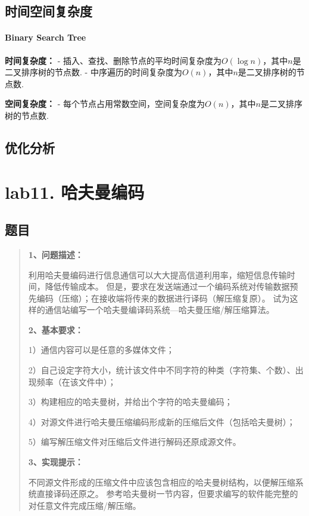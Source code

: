 \documentclass[UTF8]{ctexart}
\begin{document}
\subsection*{时间空间复杂度}
\paragraph*{Binary Search Tree}
\textbf{时间复杂度：}
- 插入、查找、删除节点的平均时间复杂度为$O(\log n)$，其中$n$是二叉排序树的节点数.
- 中序遍历的时间复杂度为$O(n)$，其中$n$是二叉排序树的节点数.

\textbf{空间复杂度：}
- 每个节点占用常数空间，空间复杂度为$O(n)$，其中$n$是二叉排序树的节点数.


\subsection*{优化分析}

\newpage
\section*{lab11. 哈夫曼编码}
\subsection*{题目}
\begin{abstract}
    \textbf{1、问题描述：}

    利用哈夫曼编码进行信息通信可以大大提高信道利用率，缩短信息传输时间，降低传输成本。
    但是，要求在发送端通过一个编码系统对传输数据预先编码（压缩）；在接收端将传来的数据进行译码（解压缩复原）。
    试为这样的通信站编写一个哈夫曼编译码系统---哈夫曼压缩/解压缩算法。

    \textbf{2、基本要求：}

    1）通信内容可以是任意的多媒体文件；

    2）自己设定字符大小，统计该文件中不同字符的种类（字符集、个数）、出现频率（在该文件中）；

    3）构建相应的哈夫曼树，并给出个字符的哈夫曼编码；
    
    4）对源文件进行哈夫曼压缩编码形成新的压缩后文件（包括哈夫曼树）；

    5）编写解压缩文件对压缩后文件进行解码还原成源文件。

    \textbf{3、实现提示：}

    不同源文件形成的压缩文件中应该包含相应的哈夫曼树结构，以便解压缩系统直接译码还原之。
    参考哈夫曼树一节内容，但要求编写的软件能完整的对任意文件完成压缩/解压缩。  

\end{abstract}
\end{document}
